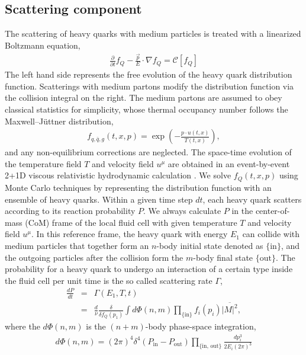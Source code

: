 \documentclass[aps, prc, reprint, amsmath, groupedaddress, nofootinbib]{revtex4-1}
\begin{document}
\subsection{Scattering component}
The scattering of heavy quarks with medium particles is treated with a linearized Boltzmann equation,
\begin{eqnarray}
  \frac{\partial}{\partial t}f_Q - \frac{\vec{p}}{E}\cdot\nabla f_Q  = 
\mathcal{C}[f_Q]
\end{eqnarray}
The left hand side represents the free evolution of the heavy quark distribution function. 
Scatterings with medium partons modify the distribution function via the collision integral on the right.
The medium partons are assumed to obey classical statistics for simplicity, whose thermal occupancy number follows the Maxwell--J\"uttner distribution, 
\begin{eqnarray}
f_{q,\bar{q}, g}(t,x,p) = \exp\left(-\frac{p \cdot u(t,x)}{T(t,x)}\right),
\end{eqnarray}
and any non-equilibrium corrections are neglected.
The space-time evolution of the temperature field $T$ and velocity field $u^\mu$ are obtained in an event-by-event 2+1D viscous relativistic hydrodynamic calculation \cite{Heinz:2005bw,Song:2007ux,Shen:2014vra}.
We solve $f_Q(t,x,p)$ using Monte Carlo techniques by representing the distribution function with an ensemble of heavy quarks.
Within a given time step $dt$, each heavy quark scatters according to its reaction probability $P$.
We always calculate $P$ in the center-of-mass (CoM) frame of the local fluid cell with given temperature $T$ and velocity field $u^\mu$.
In this reference frame, the heavy quark with energy $E_1$ can collide with medium particles that together form an $n$-body initial state denoted as $\{\textrm{in}\}$, and the outgoing particles after the collision form the $m$-body final state $\{\textrm{out}\}$.
The probability for a heavy quark to undergo an interaction of a certain type inside the fluid cell per unit time is the so called scattering rate $\Gamma$,
\begin{eqnarray}\label{eq:rate}
    \frac{dP}{dt} &=& \Gamma(E_1, T, t) \nonumber \\
    &=& \frac{d}{\nu} \frac{\delta}{\delta f_Q(p_1)}\int d\Phi(n,m) \prod_{\textrm{\{in\}}} f_i(p_i) 
\overline{|M|^2},
\end{eqnarray}
where the $d\Phi(n,m)$ is the $(n+m)$-body phase-space integration,
\begin{eqnarray}
\nonumber
d\Phi(n,m) = (2\pi)^4\delta^4\left(P_{\textrm{in}}-P_{\textrm{out}}\right)\prod_{\{\textrm{in, out}\}} \frac{dp_i^3}{2E_i(2\pi)^3} 
\end{eqnarray}
\end{document}

